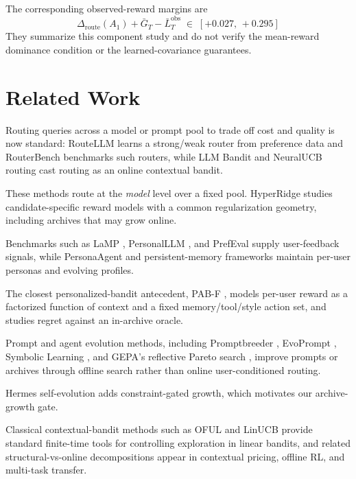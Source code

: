 \documentclass{article} %
\begin{document}
The corresponding observed-reward margins are
\begin{equation}
\label{eq:conc-margins}
\Delta_{\mathrm{route}}(A_1) + \bar G_T - \bar L_T^{\mathrm{obs}}
\;\in\; [+0.027,\, +0.295]
\end{equation}
They summarize this component study and do not verify the mean-reward
dominance condition or the learned-covariance guarantees.

\FloatBarrier
\section{Related Work}

\label{sec:related}

Routing queries across a model or prompt pool to trade off cost and quality is now standard: RouteLLM \citep{ong2024routellm} learns a strong/weak router from preference data and RouterBench \citep{hu2024routerbench} benchmarks such routers, while LLM Bandit \citep{li2025llmbandit} and NeuralUCB routing \citep{tsai2026neuralucb} cast routing as an online contextual bandit.

These methods route at the \emph{model} level over a fixed pool.
HyperRidge studies candidate-specific reward models with a common
regularization geometry, including archives that may grow online.

Benchmarks such as LaMP \citep{salemi2023lamp}, PersonalLLM \citep{zollo2024personalllm}, and PrefEval \citep{zhao2025prefeval} supply user-feedback signals, while PersonaAgent \citep{zhang2025personaagent} and persistent-memory frameworks \citep{westhausser2025persistent} maintain per-user personas and evolving profiles.

The closest personalized-bandit antecedent, PAB-F \citep{jin2026personalizing}, models per-user reward as a factorized function of context and a fixed memory/tool/style action set, and studies regret against an in-archive oracle.

Prompt and agent evolution methods, including Promptbreeder \citep{fernando2023promptbreeder}, EvoPrompt \citep{guo2024evoprompt}, Symbolic Learning \citep{zhou2024symbolic}, and GEPA's reflective Pareto search \citep{agrawal2025geparp}, improve prompts or archives through offline search rather than online user-conditioned routing.

Hermes self-evolution \citep{hermes_selfevolution,hermes_agent} adds constraint-gated growth, which motivates our archive-growth gate.

Classical contextual-bandit methods such as OFUL and LinUCB \citep{abbasi2011oful,chu2011linucb,li2010contextual} provide standard finite-time tools for controlling exploration in linear bandits, and related structural-vs-online decompositions appear in contextual pricing, offline RL, and multi-task transfer.
\end{document}
